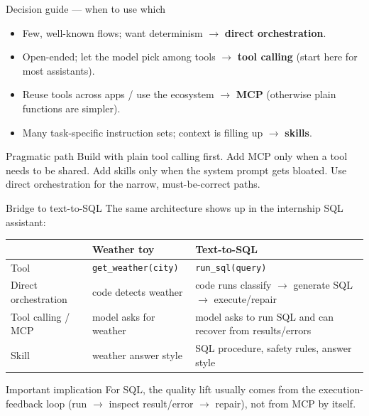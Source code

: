 \documentclass[aspectratio=169,10pt]{beamer}
\begin{document}
\begin{frame}{Decision guide --- when to use which}
  \begin{itemize}
    \item \alert{Few, well-known flows; want determinism} $\rightarrow$ \textbf{direct orchestration}.
    \item \alert{Open-ended; let the model pick among tools} $\rightarrow$ \textbf{tool calling} (start here for most assistants).
    \item \alert{Reuse tools across apps / use the ecosystem} $\rightarrow$ \textbf{MCP} (otherwise plain functions are simpler).
    \item \alert{Many task-specific instruction sets; context is filling up} $\rightarrow$ \textbf{skills}.
  \end{itemize}
  \vfill
  \begin{block}{Pragmatic path}
    \footnotesize Build with plain \alert{tool calling} first. Add \alert{MCP} only when a tool
    needs to be shared. Add \alert{skills} only when the system prompt gets bloated. Use
    \alert{direct orchestration} for the narrow, must-be-correct paths.
  \end{block}
\end{frame}

\begin{frame}{Bridge to text-to-SQL}
  The same architecture shows up in the internship SQL assistant:
  \vfill
  \begin{tabular}{@{}p{3.1cm}p{3.5cm}p{3.5cm}@{}}
    \toprule
    & \textbf{Weather toy} & \textbf{Text-to-SQL} \\
    \midrule
    Tool & \texttt{get\_weather(city)} & \texttt{run\_sql(query)} \\
    Direct orchestration & code detects weather & code runs classify $\rightarrow$ generate SQL $\rightarrow$ execute/repair \\
    Tool calling / MCP & model asks for weather & model asks to run SQL and can recover from results/errors \\
    Skill & weather answer style & SQL procedure, safety rules, answer style \\
    \bottomrule
  \end{tabular}
  \vfill
  \begin{block}{Important implication}
    \footnotesize For SQL, the quality lift usually comes from the \alert{execution-feedback loop}
    (run $\rightarrow$ inspect result/error $\rightarrow$ repair), not from MCP by itself.
  \end{block}
\end{frame}
\end{document}
